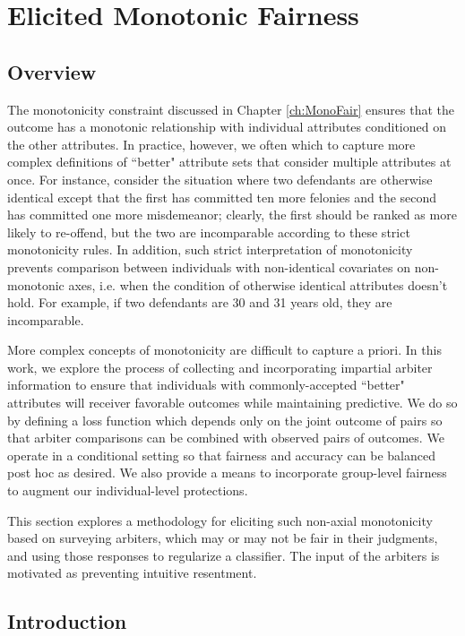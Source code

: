 \chapter{Elicited Monotonic Fairness} \label{ch:SoftMonoFair}
\newcommand{\xc}{c}

\section{Overview}

    The monotonicity constraint discussed in Chapter \ref{ch:MonoFair} ensures that the outcome has a monotonic relationship with individual attributes conditioned on the other attributes.  In practice, however, we often which to capture more complex definitions of ``better" attribute sets that consider multiple attributes at once.  For instance, consider the situation where two defendants are otherwise identical except that the first has committed ten more felonies and the second has committed one more misdemeanor; clearly, the first should be ranked as more likely to re-offend, but the two are incomparable according to these strict monotonicity rules.  In addition, such strict interpretation of monotonicity prevents comparison between individuals with non-identical covariates on non-monotonic axes, i.e. when the condition of otherwise identical attributes doesn't hold.  For example, if two defendants are 30 and 31 years old, they are incomparable.
    
    More complex concepts of monotonicity are difficult to capture a priori.  In this work, we explore the process of collecting and incorporating impartial arbiter information to ensure that individuals with commonly-accepted ``better" attributes will receiver favorable outcomes while maintaining predictive.  We do so by defining a loss function which depends only on the joint outcome of pairs so that arbiter comparisons can be combined with observed pairs of outcomes.  We operate in a conditional setting so that fairness and accuracy can be balanced post hoc as desired.    We also provide a means to incorporate group-level fairness to augment our individual-level protections.
    
    This section explores a methodology for eliciting such non-axial monotonicity based on surveying arbiters, which may or may not be fair in their judgments, and using those responses to regularize a classifier.  The input of the arbiters is motivated as preventing intuitive resentment. 

\section{Introduction}\label{sec:softmono_bg}
    
